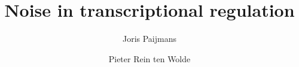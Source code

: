 \documentclass[a4paper,10pt]{article}
\begin{document}
\title{Noise in transcriptional regulation}

\author{Joris Paijmans \\ \AMOLF}
\author{Pieter Rein ten Wolde \\ \AMOLF}



%
%
%

%

\clearpage
\newpage
\appendix
{}
%
%


\clearpage
\newpage


\end{document}
